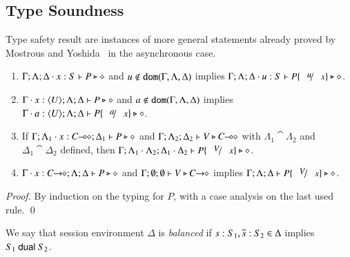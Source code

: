 \subsection{Type Soundness}

Type safety result are instances of more general statements already proved by
Mostrous and Yoshida~\cite{tlca07} in the asynchronous case.

\begin{lemma}\rm
	\label{lem:subst}
	\begin{enumerate}[1.]
		\item	$\Gamma; \Lambda; \Delta \cdot x:S  \vdash P \triangleright \diamond$ and
			$u \not\in \mathtt{dom}(\Gamma, \Lambda, \Delta)$
			implies
			$\Gamma; \Lambda; \Delta \cat u:S  \proves P\subst{u}{x} \hastype \Proc$.

		\item	$\Gamma \cdot x:\langle U \rangle; \Lambda; \Delta \vdash P \triangleright \diamond$ and
			$a \notin \mathtt{dom}(\Gamma, \Lambda, \Delta)$
			implies
			$\Gamma \cat a:\chtype{U}; \Lambda; \Delta \proves P\subst{a}{x} \hastype \Proc$.

		\item	If $\Gamma; \Lambda_1 \cdot x:C\!\! \multimap\!\! \diamond; \Delta_1  \vdash P \triangleright \diamond$ 
			and $\Gamma; \Lambda_2; \Delta_2  \vdash V \triangleright C\!\! \multimap\!\! \diamond$ with 
			$\Lambda_1 \cat \Lambda_2$ and $\Delta_1 \cat \Delta_2$ defined,
			then $\Gamma; \Lambda_1 \cat \Lambda_2; \Delta_1 \cat \Delta_2  \proves P\subst{V}{x} \hastype \Proc$.

		\item	$\Gamma \cdot x:C\!\! \rightarrow\!\! \diamond; \Lambda; \Delta  \vdash P \triangleright \diamond$ and
			$\Gamma; \emptyset ; \emptyset \vdash V \triangleright C\!\! \rightarrow\!\! \diamond$
			implies
			$\Gamma; \Lambda; \Delta \proves P\subst{V}{x} \hastype \Proc$.
		\end{enumerate}
\end{lemma}

\begin{proof}
	By induction on the typing for $P$, with a case analysis on the last used rule. 
	\qed
\end{proof}

\begin{definition}\label{d:wtenv}\rm
	We say that session environment $\Delta$ is {\em balanced} if
	$s: S_1, \overline{s}: S_2 \in \Delta$ implies $S_1 \ \mathsf{dual}\  S_2$.
\end{definition}

